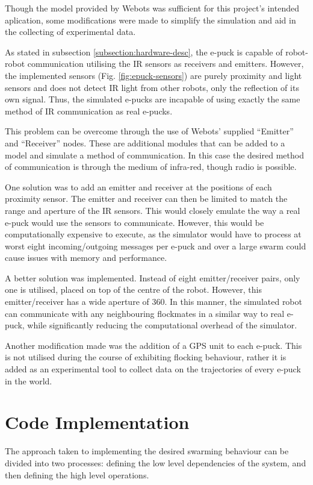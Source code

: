 Though the model provided by Webots was sufficient for this project's intended aplication, some modifications were made to simplify the simulation and aid in the collecting of experimental data.

As stated in subsection \ref{subsection:hardware-desc}, the e-puck is capable of robot-robot communication utilising the IR sensors as receivers and emitters. However, the implemented sensors (Fig. \ref{fig:epuck-sensors}) are purely proximity and light sensors and does not detect IR light from other robots, only the reflection of its own signal. Thus, the simulated e-pucks are incapable of using exactly the same method of IR communication as real e-pucks.

This problem can be overcome through the use of Webots' supplied ``Emitter'' and ``Receiver'' nodes. These are additional modules that can be added to a model and simulate a method of communication. In this case the desired method of communication is through the medium of infra-red, though radio is possible.

One solution was to add an emitter and receiver at the positions of each proximity sensor. The emitter and receiver can then be limited to match the range and aperture of the IR sensors. This would closely emulate the way a real e-puck would use the sensors to communicate. However, this would be computationally expensive to execute, as the simulator would have to process at worst eight incoming/outgoing messages per e-puck and over a large swarm could cause issues with memory and performance.

A better solution was implemented. Instead of eight emitter/receiver pairs, only one is utilised, placed on top of the centre of the robot. However, this emitter/receiver has a wide aperture of 360\textdegree. In this manner, the simulated robot can communicate with any neighbouring flockmates in a similar way to real e-puck, while significantly reducing the computational overhead of the simulator.

Another modification made was the addition of a GPS unit to each e-puck. This is not utilised during the course of exhibiting flocking behaviour, rather it is added as an experimental tool to collect data on the trajectories of every e-puck in the world.

\section{Code Implementation}

The approach taken to implementing the desired swarming behaviour can be divided into two processes: defining the low level dependencies of the system, and then defining the high level operations.

